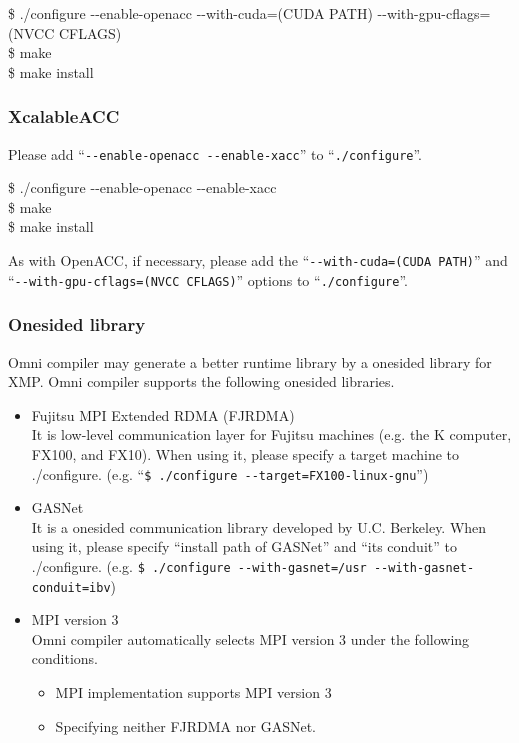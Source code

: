 \documentclass[graybox]{svmult}
\begin{document}
\begin{svgraybox}
\$ ./configure {-}{-}enable-openacc {-}{-}with-cuda=(CUDA PATH) {-}{-}with-gpu-cflags=(NVCC CFLAGS)\\
\$ make\\
\$ make install
\end{svgraybox}

\subsubsection{XcalableACC}
Please add ``{\tt {-}{-}enable-openacc {-}{-}enable-xacc}'' to ``{\tt ./configure}''.

\begin{svgraybox}
\$ ./configure {-}{-}enable-openacc {-}{-}enable-xacc\\
\$ make\\
\$ make install
\end{svgraybox}
As with OpenACC, if necessary,
please add the ``{\tt {-}{-}with-cuda=(CUDA PATH)}'' and ``{\tt {-}{-}with-gpu-cflags=(NVCC CFLAGS)}'' options to ``{\tt ./configure}''.

\subsubsection{Onesided library}
Omni compiler may generate a better runtime library by a onesided library for XMP. 
Omni compiler supports the following onesided libraries.

\begin{itemize}
\item Fujitsu MPI Extended RDMA (FJRDMA)\\
It is low-level communication layer for Fujitsu machines (e.g. the K computer, FX100, and FX10).
When using it, please specify a target machine to ./configure. (e.g. ``{\tt \$ ./configure {-}{-}target=FX100-linux-gnu}'')
\item GASNet\cite{gasnet}\\
It is a onesided communication library developed by U.C. Berkeley. 
When using it, please specify ``install path of GASNet'' and ``its conduit'' to ./configure. (e.g. {\tt \$ ./configure {-}{-}with-gasnet=/usr {-}{-}with-gasnet-conduit=ibv})
\item MPI version 3\\
Omni compiler automatically selects MPI version 3 under the following conditions.
\begin{itemize}
\item MPI implementation supports MPI version 3
\item Specifying neither FJRDMA nor GASNet.
\end{itemize}
\end{itemize}
\end{document}
